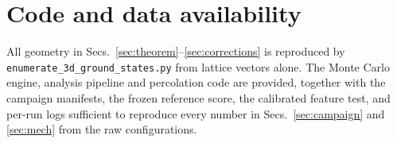 \documentclass[aps,prl,twocolumn,superscriptaddress,floatfix]{revtex4-2}
\begin{document}
\section*{Code and data availability}

All geometry in Secs.~\ref{sec:theorem}--\ref{sec:corrections} is reproduced by
\texttt{enumerate\_3d\_ground\_states.py} from lattice vectors alone. The Monte
Carlo engine, analysis pipeline and percolation code are provided, together
with the campaign manifests, the frozen reference score, the calibrated
feature test, and per-run logs sufficient to reproduce every number in
Secs.~\ref{sec:campaign} and \ref{sec:mech} from the raw configurations.
\end{document}
